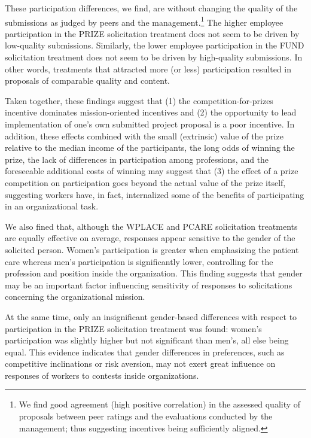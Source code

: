 \documentclass[11pt, titlepage]{article}
\begin{document}
These participation differences, we find, are without changing the
quality of the submissions as judged by peers and the
management.\footnote{We find good agreement (high positive correlation)
  in the assessed quality of proposals between peer ratings and the
  evaluations conducted by the management; thus suggesting incentives
  being sufficiently aligned.} The higher employee participation in the
PRIZE solicitation treatment does not seem to be driven by low-quality
submissions. Similarly, the lower employee participation in the FUND
solicitation treatment does not seem to be driven by high-quality
submissions. In other words, treatments that attracted more (or less)
participation resulted in proposals of comparable quality and content.

Taken together, these findings suggest that (1) the
competition-for-prizes incentive dominates mission-oriented incentives
and (2) the opportunity to lead implementation of one's own submitted
project proposal is a poor incentive. In addition, these effects
combined with the small (extrinsic) value of the prize relative to the
median income of the participants, the long odds of winning the prize,
the lack of differences in participation among professions, and the
foreseeable additional costs of winning may suggest that (3) the effect
of a prize competition on participation goes beyond the actual value of
the prize itself, suggesting workers have, in fact, internalized some of
the benefits of participating in an organizational task.

We also fined that, although the WPLACE and PCARE solicitation
treatments are equally effective on average, responses appear sensitive
to the gender of the solicited person. Women's participation is greater
when emphasizing the patient care whereas men's participation is
significantly lower, controlling for the profession and position inside
the organization. This finding suggests that gender may be an important
factor influencing sensitivity of responses to solicitations concerning
the organizational mission.

At the same time, only an insignificant gender-based differences with
respect to participation in the PRIZE solicitation treatment was found:
women's participation was slightly higher but not significant than
men's, all else being equal. This evidence indicates that gender
differences in preferences, such as competitive inclinations or risk
aversion, may not exert great influence on responses of workers to
contests inside organizations.
\end{document}

